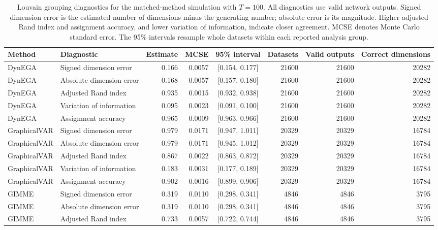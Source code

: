 \documentclass[
]{article}
\begin{document}
\begin{landscape}\scriptsize\setlength{\tabcolsep}{1.25pt}
\begin{table}

\caption{Louvain grouping diagnostics for the matched-method simulation with $T=100$. All diagnostics use valid network outputs. Signed dimension error is the estimated number of dimensions minus the generating number; absolute error is its magnitude. Higher adjusted Rand index and assignment accuracy, and lower variation of information, indicate closer agreement. MCSE denotes Monte Carlo standard error. The 95\% intervals resample whole datasets within each reported analysis group.}
\centering
\begin{tabular}[t]{llrrcrrr}
\toprule
Method & Diagnostic & Estimate & MCSE & 95\% interval & Datasets & Valid outputs & Correct dimensions\\
\midrule
DynEGA & Signed dimension error & 0.166 & 0.0057 & {}[0.154, 0.177] & 21600 & 21600 & 20282\\
DynEGA & Absolute dimension error & 0.168 & 0.0057 & {}[0.157, 0.180] & 21600 & 21600 & 20282\\
DynEGA & Adjusted Rand index & 0.935 & 0.0015 & {}[0.932, 0.938] & 21600 & 21600 & 20282\\
DynEGA & Variation of information & 0.095 & 0.0023 & {}[0.091, 0.100] & 21600 & 21600 & 20282\\
DynEGA & Assignment accuracy & 0.965 & 0.0009 & {}[0.963, 0.966] & 21600 & 21600 & 20282\\
\addlinespace
GraphicalVAR & Signed dimension error & 0.979 & 0.0171 & {}[0.947, 1.011] & 20329 & 20329 & 16784\\
GraphicalVAR & Absolute dimension error & 0.979 & 0.0171 & {}[0.945, 1.012] & 20329 & 20329 & 16784\\
GraphicalVAR & Adjusted Rand index & 0.867 & 0.0022 & {}[0.863, 0.872] & 20329 & 20329 & 16784\\
GraphicalVAR & Variation of information & 0.183 & 0.0031 & {}[0.177, 0.189] & 20329 & 20329 & 16784\\
GraphicalVAR & Assignment accuracy & 0.902 & 0.0016 & {}[0.899, 0.906] & 20329 & 20329 & 16784\\
\addlinespace
GIMME & Signed dimension error & 0.319 & 0.0110 & {}[0.298, 0.341] & 4846 & 4846 & 3795\\
GIMME & Absolute dimension error & 0.319 & 0.0110 & {}[0.298, 0.341] & 4846 & 4846 & 3795\\
GIMME & Adjusted Rand index & 0.733 & 0.0057 & {}[0.722, 0.744] & 4846 & 4846 & 3795\\

\end{tabular}
\end{table}
\end{landscape}
\end{document}
